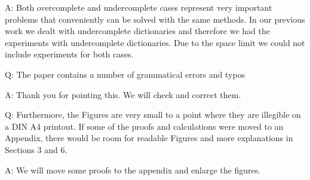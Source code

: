 \documentclass{article}
\begin{document}
A: Both overcomplete and undercomplete cases represent very important problems that conveniently can be solved with the same methods. In our previous work we dealt with undercomplete dictionaries and therefore we had the experiments with undercomplete dictionaries. Due to the space limit we could not include experiments for both cases.
\newline
\newline

Q: The paper contains a number of grammatical errors and typos

A: Thank you for pointing this. We will check and correct them.
\newline
\newline

Q: Furthermore, the Figures are very small to a point where they are illegible on a DIN A4 printout.
If some of the proofs and calculations were moved to an Appendix, there would be room for readable Figures and more explanations in Sections 3 and 6.

A: We will move some proofs to the appendix and enlarge the figures.
\end{document}
